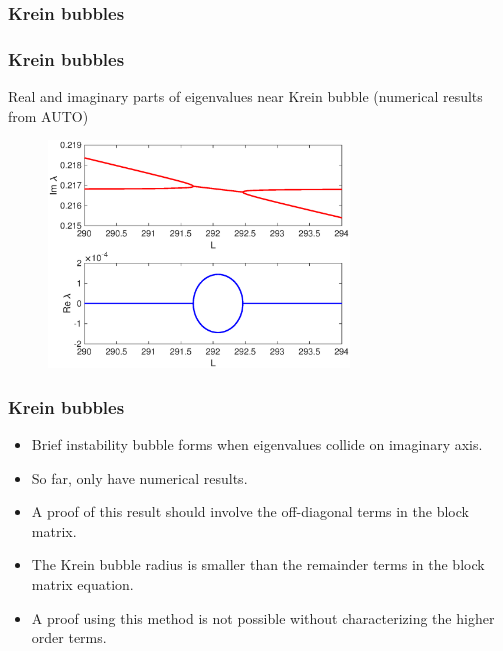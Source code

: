 \documentclass[16pt]{beamer}
\begin{document}
\begin{frame}
	\frametitle{Krein bubbles}
	\fontsize{16}{7.2}\selectfont
	\begin{center}
	\end{center}
\end{frame}

\begin{frame}
	\frametitle{Krein bubbles}
	\fontsize{16}{7.2}\selectfont
	Real and imaginary parts of eigenvalues near Krein bubble (numerical results from AUTO)
		\begin{figure}
		\begin{center}
		\includegraphics[width=8cm]{images/Kreinbubble1.eps}
		\end{center}
		\end{figure}
\end{frame}

\begin{frame}
	\frametitle{Krein bubbles}
	\fontsize{16}{7.2}\selectfont
	\begin{itemize}
		\item Brief instability bubble forms when eigenvalues collide on imaginary axis.
		\vspace{0.25cm}
		\item So far, only have numerical results.
		\vspace{0.25cm}
		\item A proof of this result should involve the off-diagonal terms in the block matrix.
		\vspace{0.25cm}
		\item The Krein bubble radius is smaller than the remainder terms in the block matrix equation.
		\vspace{0.25cm}
		\item A proof using this method is not possible without characterizing the higher order terms.
	\end{itemize}

\end{frame}
\end{document}
